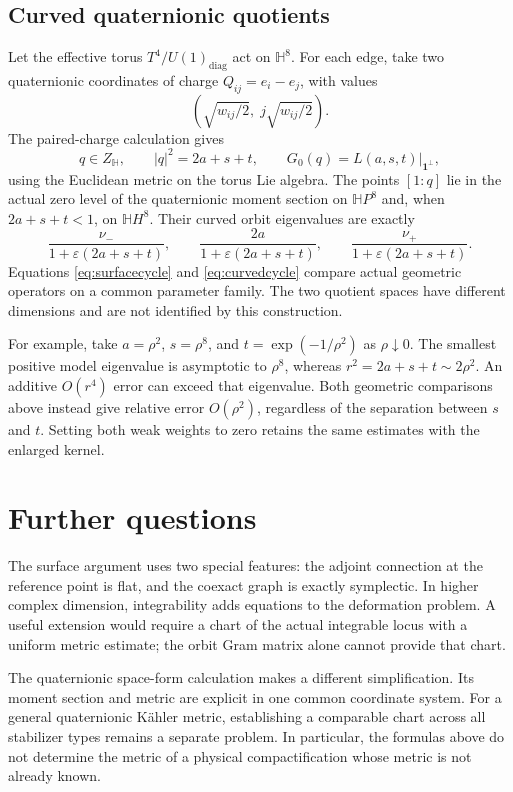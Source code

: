 \documentclass[11pt]{amsart}
\theoremstyle{definition}
\theoremstyle{remark}
\newcommand{\Hh}{\mathbb H}
\begin{document}
\subsection{Curved quaternionic quotients}
Let the effective torus $T^4/U(1)_{\mathrm{diag}}$ act on
$\Hh^8$. For each edge, take two quaternionic coordinates of
charge $Q_{ij}=e_i-e_j$, with values
\[
 \left(\sqrt{w_{ij}/2},\;j\sqrt{w_{ij}/2}\right).
\]
The paired-charge calculation gives
\[
 q\in Z_\Hh,\qquad |q|^2=2a+s+t,\qquad
 G_0(q)=L(a,s,t)|_{\mathbf1^\perp},
\]
using the Euclidean metric on the torus Lie algebra. The points
$[1:q]$ lie in the actual zero level of the quaternionic moment
section on $\Hh P^8$ and, when $2a+s+t<1$, on $\Hh H^8$.
Their curved orbit
eigenvalues are exactly
\begin{equation}\label{eq:curvedcycle}
 \frac{\nu_-}{1+\varepsilon(2a+s+t)},\qquad
 \frac{2a}{1+\varepsilon(2a+s+t)},\qquad
 \frac{\nu_+}{1+\varepsilon(2a+s+t)}.
\end{equation}
Equations \eqref{eq:surfacecycle} and \eqref{eq:curvedcycle}
compare actual geometric operators on a common parameter family.
The two quotient spaces have different dimensions and are not
identified by this construction.

For example, take $a=\rho^2$, $s=\rho^8$, and
$t=\exp(-1/\rho^2)$ as $\rho\downarrow0$. The smallest positive
model eigenvalue is asymptotic to $\rho^8$, whereas
$r^2=2a+s+t\sim2\rho^2$. An additive $O(r^4)$ error can
exceed that eigenvalue. Both geometric comparisons above instead
give relative error $O(\rho^2)$, regardless of the separation
between $s$ and $t$. Setting both weak weights to zero retains
the same estimates with the enlarged kernel.

\section{Further questions}

The surface argument uses two special features: the adjoint
connection at the reference point is flat, and the coexact graph
is exactly symplectic. In higher complex dimension, integrability
adds equations to the deformation problem. A useful extension
would require a chart of the actual integrable locus with a
uniform metric estimate; the orbit Gram matrix alone cannot
provide that chart.

The quaternionic space-form calculation makes a different
simplification. Its moment section and metric are explicit in
one common coordinate system. For a general quaternionic Kähler
metric, establishing a comparable chart across all stabilizer
types remains a separate problem. In particular, the formulas
above do not determine the metric of a physical compactification
whose metric is not already known.
\end{document}
